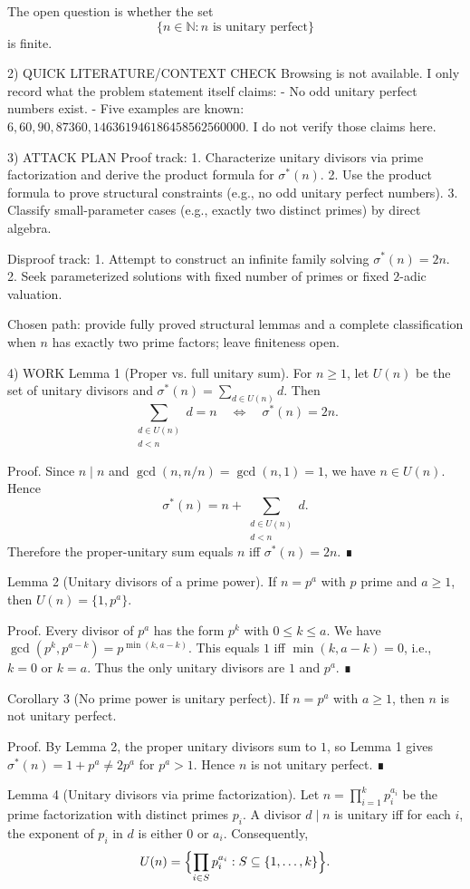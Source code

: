 The open question is whether the set
\[
\{n\in \mathbb{N} : n \text{ is unitary perfect}\}
\]
is finite.

2) QUICK LITERATURE/CONTEXT CHECK
Browsing is not available. I only record what the problem statement itself claims:
- No odd unitary perfect numbers exist.
- Five examples are known: $6,60,90,87360,146361946186458562560000$.
I do not verify those claims here.

3) ATTACK PLAN
Proof track:
1. Characterize unitary divisors via prime factorization and derive the product formula for $\sigma^*(n)$.
2. Use the product formula to prove structural constraints (e.g., no odd unitary perfect numbers).
3. Classify small-parameter cases (e.g., exactly two distinct primes) by direct algebra.

Disproof track:
1. Attempt to construct an infinite family solving $\sigma^*(n)=2n$.
2. Seek parameterized solutions with fixed number of primes or fixed $2$-adic valuation.

Chosen path: provide fully proved structural lemmas and a complete classification when $n$ has exactly two prime factors;
leave finiteness open.

4) WORK
Lemma 1 (Proper vs. full unitary sum).
For $n\ge 1$, let $U(n)$ be the set of unitary divisors and $\sigma^*(n)=\sum_{d\in U(n)} d$. Then
\[
\sum_{\substack{d\in U(n) \\ d<n}} d = n \quad\Longleftrightarrow\quad \sigma^*(n)=2n.
\]

Proof.
Since $n\mid n$ and $\gcd(n,n/n)=\gcd(n,1)=1$, we have $n\in U(n)$. Hence
\[
\sigma^*(n) = n + \sum_{\substack{d\in U(n) \\ d<n}} d.
\]
Therefore the proper-unitary sum equals $n$ iff $\sigma^*(n)=2n$. ∎

Lemma 2 (Unitary divisors of a prime power).
If $n=p^a$ with $p$ prime and $a\ge 1$, then $U(n)=\{1,p^a\}$.

Proof.
Every divisor of $p^a$ has the form $p^k$ with $0\le k\le a$. We have
$\gcd(p^k,p^{a-k})=p^{\min(k,a-k)}$. This equals $1$ iff $\min(k,a-k)=0$, i.e.,
$k=0$ or $k=a$. Thus the only unitary divisors are $1$ and $p^a$. ∎

Corollary 3 (No prime power is unitary perfect).
If $n=p^a$ with $a\ge 1$, then $n$ is not unitary perfect.

Proof.
By Lemma 2, the proper unitary divisors sum to $1$, so Lemma 1 gives
$\sigma^*(n)=1+p^a\ne 2p^a$ for $p^a>1$. Hence $n$ is not unitary perfect. ∎

Lemma 4 (Unitary divisors via prime factorization).
Let $n=\prod_{i=1}^k p_i^{a_i}$ be the prime factorization with distinct primes $p_i$.
A divisor $d\mid n$ is unitary iff for each $i$, the exponent of $p_i$ in $d$ is either $0$ or $a_i$.
Consequently,
\[
U(n)=\Bigl\{\prod_{i\in S} p_i^{a_i} : S\subseteq \{1,\dots,k\}\Bigr\}.
\]

